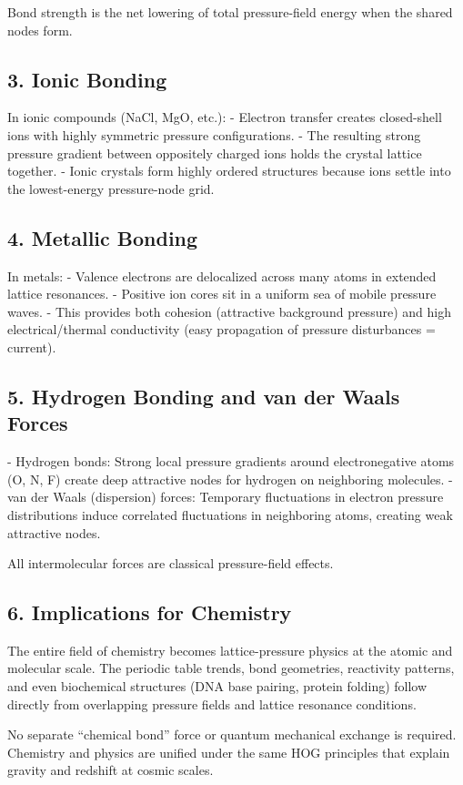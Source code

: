 \documentclass[11pt,a4paper]{book}
\begin{document}
{Bond strength is the net lowering of total pressure-field energy when the shared nodes form.

\subsection{3. Ionic Bonding}
In ionic compounds (NaCl, MgO, etc.):
- Electron transfer creates closed-shell ions with highly symmetric pressure configurations.
- The resulting strong pressure gradient between oppositely charged ions holds the crystal lattice together.
- Ionic crystals form highly ordered structures because ions settle into the lowest-energy pressure-node grid.

\subsection{4. Metallic Bonding}
In metals:
- Valence electrons are delocalized across many atoms in extended lattice resonances.
- Positive ion cores sit in a uniform sea of mobile pressure waves.
- This provides both cohesion (attractive background pressure) and high electrical/thermal conductivity (easy propagation of pressure disturbances = current).

\subsection{5. Hydrogen Bonding and van der Waals Forces}
- Hydrogen bonds: Strong local pressure gradients around electronegative atoms (O, N, F) create deep attractive nodes for hydrogen on neighboring molecules.
- van der Waals (dispersion) forces: Temporary fluctuations in electron pressure distributions induce correlated fluctuations in neighboring atoms, creating weak attractive nodes.

All intermolecular forces are classical pressure-field effects.

\subsection{6. Implications for Chemistry}
The entire field of chemistry becomes lattice-pressure physics at the atomic and molecular scale. The periodic table trends, bond geometries, reactivity patterns, and even biochemical structures (DNA base pairing, protein folding) follow directly from overlapping pressure fields and lattice resonance conditions.

No separate “chemical bond” force or quantum mechanical exchange is required. Chemistry and physics are unified under the same HOG principles that explain gravity and redshift at cosmic scales.

}
\end{document}
